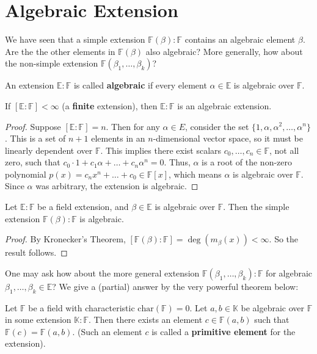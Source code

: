 \section{Algebraic Extension}
We have seen that a simple extension $\mathbb{F}(\beta):\mathbb{F}$ contains an algebraic element $\beta$. Are the the other elements in $\mathbb{F}(\beta)$ also algebraic? More generally, how about the non-simple extension $\mathbb{F}(\beta_1, \dots, \beta_k)$?

\begin{definition}
An extension $\mathbb{E}:\mathbb{F}$ is called \textbf{algebraic} if every element $\alpha \in \mathbb{E}$ is algebraic over $\mathbb{F}$.
\end{definition}

\begin{theorem}
If $[\mathbb{E}:\mathbb{F}] < \infty$ (a {\bf finite} extension), then $\mathbb{E}:\mathbb{F}$ is an algebraic extension.
\end{theorem}
\begin{proof}
Suppose $[\mathbb{E}:\mathbb{F}]=n$. Then for any $\alpha \in E$, consider the set $\{1, \alpha, \alpha^2, \dots, \alpha^n\}$. This is a set of $n+1$ elements in an $n$-dimensional vector space, so it must be linearly dependent over $\mathbb{F}$.
This implies there exist scalars $c_0, \dots, c_n \in \mathbb{F}$, not all zero, such that $c_0 \cdot 1 + c_1 \alpha + \dots + c_n \alpha^n = 0$.
Thus, $\alpha$ is a root of the non-zero polynomial $p(x) = c_nx^n + \dots + c_0 \in \mathbb{F}[x]$, which means $\alpha$ is algebraic over $\mathbb{F}$. Since $\alpha$ was arbitrary, the extension is algebraic.
\end{proof}

\begin{corollary}
Let $\mathbb{E}:\mathbb{F}$ be a field extension, and $\beta \in \mathbb{E}$ is algebraic over $\mathbb{F}$. Then the simple extension $\mathbb{F}(\beta):\mathbb{F}$ is algebraic.
\end{corollary}
\begin{proof}
By Kronecker's Theorem, $[\mathbb{F}(\beta):\mathbb{F}] = \deg(m_\beta(x)) < \infty$. So the result follows.
\end{proof}

One may ask how about the more general extension $\mathbb{F}(\beta_1, \dots, \beta_k):\mathbb{F}$ for algebraic $\beta_1, \dots, \beta_k \in \mathbb{E}$? We give a (partial) answer by the very powerful theorem below:
\begin{theorem}
Let $\mathbb{F}$ be a field with characteristic $\text{char}(\mathbb{F})=0$. Let $a, b \in \mathbb{K}$ be algebraic over $\mathbb{F}$ in some extension $\mathbb{K}:\mathbb{F}$. Then there exists an element $c \in \mathbb{F}(a,b)$ such that $\mathbb{F}(c) = \mathbb{F}(a,b)$. (Such an element $c$ is called a {\bf primitive element} for the extension).
\end{theorem}


